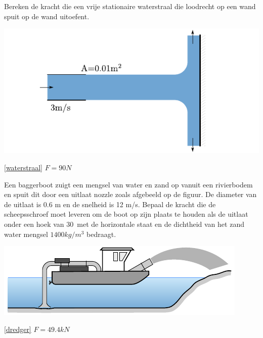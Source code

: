 \begin{toepassing}[*]
	\label{waterstraal}
Bereken de kracht die een vrije stationaire waterstraal die loodrecht op een wand spuit op de wand uitoefent.

	\centering
	\includegraphics{fig/behoudsvergelijkingen/waterstraal}
\end{toepassing}
\begin{antwoord}{\ref{waterstraal}}
	$F = 90\unit{N}$
\end{antwoord}
\begin{toepassing}
	\label{dredger}
Een baggerboot zuigt een mengsel van water en zand op vanuit een rivierbodem en spuit dit door een uitlaat nozzle zoals afgebeeld op de figuur. De diameter van de uitlaat is 0.6 m en de snelheid is 12 m/s. Bepaal de kracht die de scheepsschroef moet leveren om de boot op zijn plaats te houden als de uitlaat onder een hoek van 30\deg\ met de horizontale staat en de dichtheid van het zand water mengsel $1400\unit{kg/m^3}$ bedraagt.

	\centering
	\includegraphics{fig/behoudsvergelijkingen/dredger}
\end{toepassing}
\begin{antwoord}{\ref{dredger}}
	$F = 49.4\unit{kN}$
\end{antwoord}
